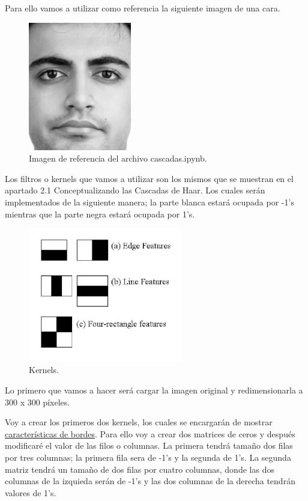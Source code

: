 \documentclass[a4paper]{article}
\begin{document}
Para ello vamos a utilizar como referencia la siguiente imagen de una cara.

\begin{figure}[h!]
    \centering
    \includegraphics[width=0.40\textwidth]{../img/cara.png}
    \caption{Imagen de referencia del archivo cascadas.ipynb.}
\end{figure}

Los filtros o kernels que vamos a utilizar son los mismos que se muestran en el apartado 2.1 Conceptualizando las Cascadas de Haar.
Los cuales serán implementados de la siguiente manera; la parte blanca estará ocupada por -1's mientras que la parte negra estará ocupada por 1's.

\begin{figure}[h!]
    \centering
    \includegraphics[width=0.6\textwidth]{../img/haar_feat.png}
    \caption{Kernels.}
\end{figure}

Lo primero que vamos a hacer será cargar la imagen original y redimensionarla a 300 x 300 píxeles.

Voy a crear los primeros dos kernels, los cuales se encargarán de mostrar \underline{características de bordes}.
Para ello voy a crear dos matrices de ceros y después modificaré el valor de las filos o columnas. La primera tendrá tamaño dos filas por tres columnas; la primera fila sera de -1's y la segunda de 1's.
La segunda matriz tendrá un tamaño de dos filas por cuatro columnas, donde las dos columnas de la izquieda serán de -1's y las dos columnas de la derecha tendrán valores de 1's.
\end{document}
